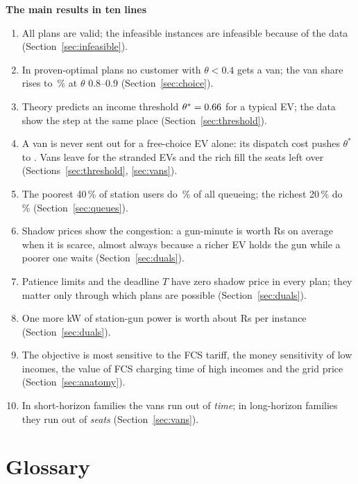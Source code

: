\documentclass[11pt,a4paper]{article}
\newcommand{\pct}{\,\%}
\begin{document}
\begin{keybox}
{\color{headblue}\textbf{The main results in ten lines}}
\begin{enumerate}[leftmargin=1.4em,itemsep=1pt]
  \item All \NValid{} plans are valid; the \NInf{} infeasible instances are infeasible because of the data (Section~\ref{sec:infeasible}).
  \item In proven-optimal plans no customer with $\theta<0.4$ gets a van; the van share rises to \VanEightNine\pct{} at $\theta$ 0.8--0.9 (Section~\ref{sec:choice}).
  \item Theory predicts an income threshold $\theta^{*}=0.66$ for a typical EV; the data show the step at the same place (Section~\ref{sec:threshold}).
  \item A van is never sent out for a free-choice EV alone: its dispatch cost pushes $\theta^{*}$ to \ThetaStarDispatch{}. Vans leave for the stranded EVs and the rich fill the seats left over (Sections~\ref{sec:threshold}, \ref{sec:vans}).
  \item The poorest 40\pct{} of station users do \QShareBottom\pct{} of all queueing; the richest 20\pct{} do \QShareTop\pct{} (Section~\ref{sec:queues}).
  \item Shadow prices show the congestion: a gun-minute is worth \GunMean{} Rs on average when it is scarce, almost always because a richer EV holds the gun while a poorer one waits (Section~\ref{sec:duals}).
  \item Patience limits and the deadline $T$ have zero shadow price in every plan; they matter only through which plans are possible (Section~\ref{sec:duals}).
  \item One more kW of station-gun power is worth about \DPFmean{} Rs per instance (Section~\ref{sec:duals}).
  \item The objective is most sensitive to the FCS tariff, the money sensitivity of low incomes, the value of FCS charging time of high incomes and the grid price (Section~\ref{sec:anatomy}).
  \item In short-horizon families the vans run out of \emph{time}; in long-horizon families they run out of \emph{seats} (Section~\ref{sec:vans}).
\end{enumerate}
\end{keybox}

\tableofcontents
\newpage

\section{Glossary}
\label{sec:glossary}
\end{document}
